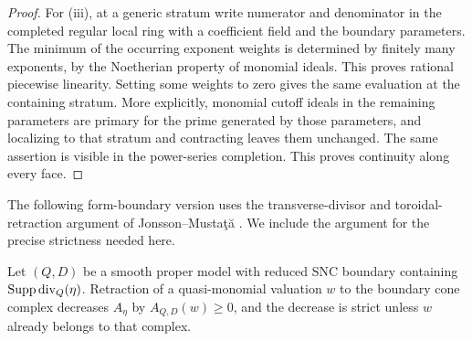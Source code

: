 \begin{proof}
For (iii), at a generic stratum write numerator and denominator in
the completed regular local ring with a coefficient field and the
boundary parameters. The minimum of the occurring exponent weights
is determined by finitely many exponents, by the Noetherian property
of monomial ideals. This proves rational piecewise linearity. Setting
some weights to zero gives the same evaluation at the containing
stratum. More explicitly, monomial cutoff ideals in the remaining
parameters are primary for the prime generated by those parameters,
and localizing to that stratum and contracting leaves them unchanged.
The same assertion is visible in the power-series completion. This
proves continuity along every face.
\end{proof}

The following form-boundary version uses the transverse-divisor and
toroidal-retraction argument of Jonsson--Musta\c t\u a
\cite[Proposition~5.1, Lemma~5.3 and Corollary~5.4]{JonssonMustata}.
We include the argument for the precise strictness needed here.

\begin{lemma}\label{val:strict-retraction}
Let $(Q,D)$ be a smooth proper model with reduced SNC boundary
containing $\operatorname{Supp}\operatorname{div}_Q(\eta)$. Retraction of a
quasi-monomial valuation $w$ to the boundary cone complex decreases
$A_\eta$ by $A_{Q,D}(w)\ge0$, and the decrease is strict unless $w$
already belongs to that complex.
\end{lemma}

